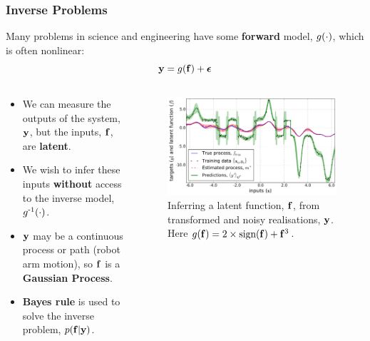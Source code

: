 \documentclass{beamer}
\begin{document}
\begin{frame}
    \frametitle{Inverse Problems}

Many problems in science and engineering have some \textbf{forward} 
model, $g\!\left({{\cdot}}\right)$, which is often nonlinear:
\begin{equation*}
    \mathbf{y} = g\!\left({{\mathbf{f}}}\right) + \boldsymbol\epsilon
\end{equation*}
\vspace{-6mm}
\begin{columns}

\begin{column}{0.5\linewidth}
\footnotesize

\begin{itemize}
    \item We can measure the outputs of the system, $\mathbf{y}$, but the inputs,
        $\mathbf{f}$, are \textbf{latent}.
    \item We wish to infer these inputs \textbf{without} access to the inverse
        model, $g^{\text{-}1}\!\left({{\cdot}}\right)$.
    \item $\mathbf{y}$ may be a continuous process or path (robot arm motion), 
        so $\mathbf{f}$ is a \textbf{Gaussian Process}.
    \item \textbf{Bayes rule} is used to solve the inverse problem,
        $p\!\left({\mathbf{f}}\middle\vert{\ensuremath{\mathbf{y}}}\right)$.
\end{itemize}

\end{column}

\begin{column}{0.5\linewidth}

\begin{figure}
    \includegraphics[width=0.75\linewidth]{fig/signdemo}

    \caption{Inferring a latent function, $\mathbf{f}$, from transformed and noisy
        realisations, $\mathbf{y}$. Here $g\!\left({{\mathbf{f}}}\right) =
        2\times\text{sign}\!\left({\mathbf{f}}\right) + \mathbf{f}^3$.}


\end{figure}
\end{column}
\end{columns}
\end{frame}
\end{document}
